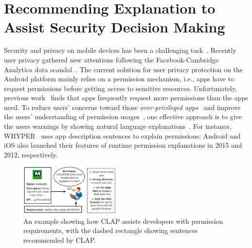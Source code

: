 
\chapter{Recommending Explanation to Assist Security Decision Making}
\label{ch4:clap}

Security and privacy on mobile devices has been a challenging task~\cite{journals/tocs/EnckGHTCCJMS14,conf/ccs/FeltCHSW11,conf/soups/FeltHEHCW12,conf/huc/LinSALHZ12,conf/soups/LinLSH14,yang2015appcontext}. Recently user privacy gathered new attentions following the Facebook-Cambridge Analytica data scandal~\cite{facebookleak}. The current solution for user privacy protection on the Android platform mainly relies on a permission mechanism, i.e., apps have to request permissions before getting access to sensitive resources. 
Unfortunately, previous work~\cite{conf/ccs/FeltCHSW11} finds that apps frequently request more permissions than the apps need. 
To reduce users' concerns toward those \emph{over-privileged apps}~\cite{conf/ccs/FeltCHSW11,journals/tocs/EnckGHTCCJMS14} and improve the users' understanding of permission usages~\cite{conf/soups/ChinFSW12,conf/chi/KelleyCS13}, one effective approach is to give the users warnings by showing natural language explanations~\cite{conf/huc/LinSALHZ12}. 
For instance, WHYPER~\cite{conf/uss/PanditaXYEX13} uses app description sentences to explain permissions; Android and iOS also launched their features of runtime permission explanations in 2015 and 2012, respectively. 

\begin{figure}[t]
\centering
\includegraphics[width=0.45\textwidth]{figure/chapter2/intro-crop.pdf}
\caption{An example showing how CLAP assists developers with permission requirements, with the dashed rectangle showing sentences recommended by CLAP.}
\label{fig:intro}
\vspace{-0.2in}
\end{figure}

